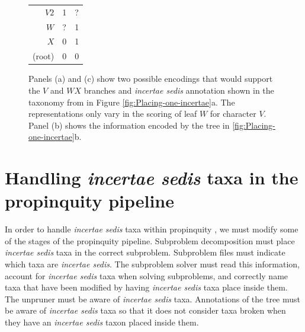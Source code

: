 \documentclass[english]{article}
\begin{document}
\begin{figure}
{\begin{tabular}{|r|p{2em}|p{2em}|}
$V2$ & 1 & ? \\
$W$  & ? & 1 \\
$X$  & 0 & 1 \\
(root) & 0 & 0 \\
\hline
\end{tabular}
}
\caption{\label{fig:Placing-one-incertae-MRP}
Panels (a) and (c) show two possible encodings that would support the $V$ and $WX$ branches and \emph{incertae sedis}
annotation shown in the taxonomy from in Figure \ref{fig:Placing-one-incertae}a.
The representations only vary in the scoring of leaf $W$ for character $V$. Panel (b) shows the information encoded by the tree in \ref{fig:Placing-one-incertae}b. }
\end{figure}


\section{Handling \emph{incertae sedis} taxa in the propinquity
pipeline}

In order to handle \emph{incertae sedis} taxa within propinquity \citep{redelings2017supertree}, we
must modify some of the stages of the propinquity pipeline.
Subproblem
decomposition must place \emph{incertae sedis} taxa in the correct
subproblem.
Subproblem files must indicate which taxa are \emph{incertae sedis}.
The subproblem solver must read this information, account for
\emph{incertae sedis} taxa when solving subproblems, and correctly
name taxa that have been modified by having \emph{incertae sedis} taxa
place inside them.
The unpruner must be aware of \emph{incertae sedis}
taxa.
Annotations of the tree must be aware of \emph{incertae sedis}
taxa so that it does not consider taxa broken when they have an
\emph{incertae sedis} taxon placed inside them.



\end{document}
